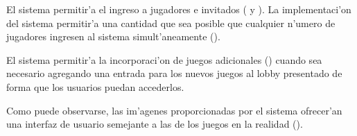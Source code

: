 El sistema permitir'a el ingreso a jugadores e invitados ( y ). La implementaci'on del sistema permitir'a una cantidad que sea posible que cualquier n'umero de jugadores ingresen al sistema simult'aneamente ().

El sistema permitir'a la incorporaci'on de juegos adicionales () cuando sea necesario agregando una entrada para los nuevos juegos al lobby presentado de forma que los usuarios puedan accederlos.
\clearpage

 
Como puede observarse, las im'agenes proporcionadas por el sistema ofrecer'an una interfaz de usuario semejante a las de los juegos en la realidad ().

